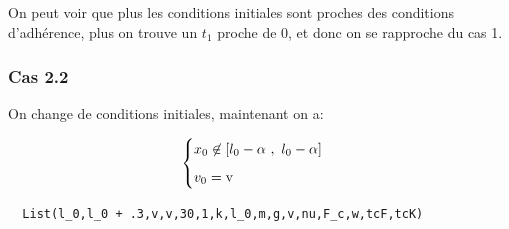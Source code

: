 \documentclass{article}
\begin{document}
On peut voir que plus les conditions initiales sont proches des conditions d'adhérence, plus on trouve un $t_1$ proche de 0, et donc on se rapproche du cas 1.

\subsubsection{Cas 2.2}
On change de conditions initiales, maintenant on a:

$$
\begin{cases}
	\vspace{.2cm}
	x_0 \not\in [l_0-\alpha~,~l_0-\alpha]\\
	v_0 = \text{v}
\end{cases}
$$

\begin{lstlisting}
  List(l_0,l_0 + .3,v,v,30,1,k,l_0,m,g,v,nu,F_c,w,tcF,tcK)
\end{lstlisting}
\end{document}
